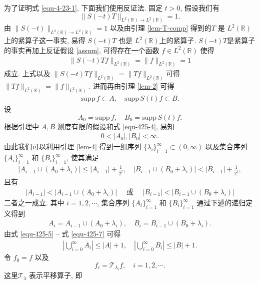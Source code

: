 \documentclass[master]{cugthesis}
\newcommand\R{\ensuremath{\mathbb{R}}}
\begin{document}
为了证明式 \eqref{equ-4-23-1}, 下面我们使用反证法. 固定 $t>0$, 
假设我们有
\begin{equation}\label{assum}
    \|S(-t) T \|_{L^2(\R)\to L^2(\R)}=1.
\end{equation}
由 $\|S(-t)\|_{L^2(\R)\to L^2(\R)}=1$ 以及由引理 \ref{lem-T-comp} 得到的$T$ 是 $L^2(\R)$ 上的紧算子这一事实, 易得 $S(-t)T$ 也是  $L^2(\R)$上的紧算子. $S(-t)T$是紧算子的事实再加上反证假设 \eqref{assum}, 可得存在一个函数 $f\in L^2(\R)$ 使得
\begin{align}\label{equ-425-3}
\|S(-t)Tf\|_{L^2(\R)}=\|f\|_{L^2(\R)}=1
\end{align}
成立.
上式以及 $\|S(-t)Tf\|_{L^2(\R)}=\|Tf\|_{L^2(\R)}$可得 $\|Tf\|_{L^2(\R)}=\|f\|_{L^2(\R)}$. 进而再由引理 \ref{lem-2} 可得
\begin{align}\label{equ-425-4}
\mathrm{supp }\, f\subset A, \quad \mathrm{supp }\,  S(t)f\subset B.
\end{align}
设
$$
A_0=\mathrm{supp }\, f, \quad B_0=\mathrm{supp }\,  S(t)f.
$$
根据引理中 $A,B$ 测度有限的假设和式 \eqref{equ-425-4}, 易知
\begin{align}\label{equ-425-10}
0<|A_0|, |B_0|<\infty.
\end{align}
 由此我们可以利用引理 \ref{lem-4} 得到一组序列 $\{\lambda_i\}_{i=1}^\infty\subset(0,\infty)$ 以及集合序列 $\lbrace A_i\rbrace_{i=1}^\infty$ 和 $\lbrace B_i\rbrace_{i=1}^\infty$, 使其满足
\begin{align}\label{equ-425-5}
|A_{i-1}\cup (A_0+\lambda_i)|\leq |A_{i-1}|+\frac{1}{2^i}, \quad   |B_{i-1}\cup (B_0+\lambda_i)|<|B_{i-1}|+\frac{1}{2^i},
\end{align}
且有
\begin{align}\label{equ-425-6}
|A_{i-1}|< |A_{i-1}\cup (A_0+\lambda_i)|  \quad  \mbox{ 或 } \quad |B_{i-1}|< |B_{i-1}\cup (B_0+\lambda_i)|
\end{align}
二者之一成立. 其中 $i=1,2,\cdots$, 集合序列 $\lbrace A_i\rbrace_{i=1}^\infty$ 和 $\lbrace B_i\rbrace_{i=1}^\infty$ 通过下述的递归定义得到 
\begin{align}\label{equ-425-7}
A_i=A_{i-1}\cup  (A_0+\lambda_i), \quad B_i=B_{i-1}\cup (B_0+\lambda_i).
\end{align}
由式 \eqref{equ-425-5} -- 式 \eqref{equ-425-7} 可得
\begin{align}\label{equ-425-8}
|\bigcup_{i=0}^{\infty}A_i|\leq |A|+1,\quad |\bigcup_{i=0}^{\infty}B_i|\leq|B|+1.
\end{align}
令 $f_0=f$ 以及
$$
f_i=\mathcal{T}_{\lambda_i}f, \quad i=1,2,\cdots.
$$
这里$\mathcal{T}_\lambda$ 表示平移算子, 即
\end{document}
